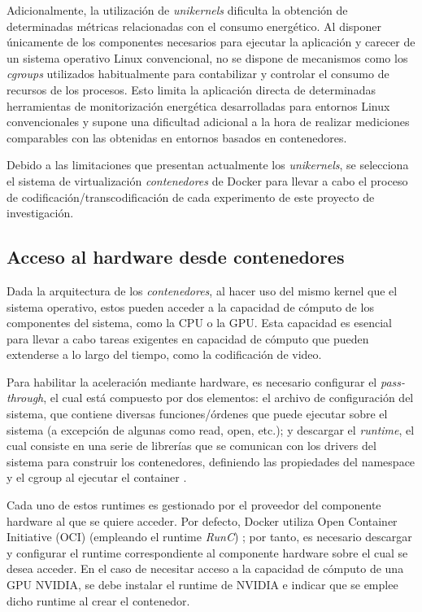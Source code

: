  Adicionalmente, la utilización de \textit{unikernels} dificulta la obtención de determinadas métricas relacionadas con el consumo energético. Al disponer únicamente de los componentes necesarios para ejecutar la aplicación y carecer de un sistema operativo Linux convencional, no se dispone de mecanismos como los \textit{cgroups} utilizados habitualmente para contabilizar y controlar el consumo de recursos de los procesos. Esto limita la aplicación directa de determinadas herramientas de monitorización energética desarrolladas para entornos Linux convencionales y supone una dificultad adicional a la hora de realizar mediciones comparables con las obtenidas en entornos basados en contenedores.

 Debido a las limitaciones que presentan actualmente los \textit{unikernels}, se selecciona el sistema de virtualización \textit{contenedores} de Docker para llevar a cabo el proceso de codificación/transcodificación de cada experimento de este proyecto de investigación.


\subsection{Acceso al hardware desde contenedores}

Dada la arquitectura de los \textit{contenedores}, al hacer uso del mismo kernel que el sistema operativo, estos pueden acceder a la capacidad de cómputo de los componentes del sistema, como la CPU o la GPU. Esta capacidad es esencial para llevar a cabo tareas exigentes en capacidad de cómputo que pueden extenderse a lo largo del tiempo, como la codificación de video.

Para habilitar la aceleración mediante hardware, es necesario configurar el \textit{pass-through}, el cual está compuesto por dos elementos: el archivo de configuración del sistema, que contiene diversas funciones/órdenes que puede ejecutar sobre el sistema (a excepción de algunas como read, open, etc.); y descargar el \textit{runtime}, el cual consiste en una serie de librerías que se comunican con los drivers del sistema para construir los contenedores, definiendo las propiedades del namespace y el cgroup al ejecutar el container \cite{hw-acceleration-container}. 

Cada uno de estos runtimes es gestionado por el proveedor del componente hardware al que se quiere acceder. Por defecto, Docker utiliza Open Container Initiative (OCI) (empleando el runtime \textit{RunC}) \cite{runtime-comparation}; por tanto, es necesario descargar y configurar el runtime correspondiente al componente hardware sobre el cual se desea acceder. En el caso de necesitar acceso a la capacidad de cómputo de una GPU NVIDIA, se debe instalar el runtime de NVIDIA e indicar que se emplee dicho runtime al crear el contenedor.

